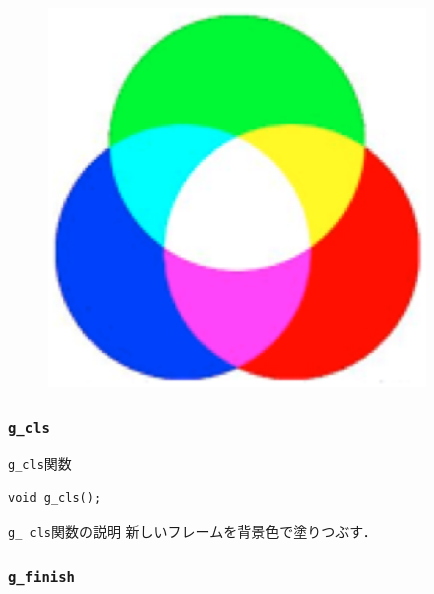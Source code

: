 \documentclass[platex,a4paper,12pt]{jsarticle}%
\begin{document}
\begin{figure}[htb]
\includegraphics[width=100mm]{./Figures/eps/Canvas_g_scr_color.eps}
\end{figure}



\subsubsection{\texttt{g\_cls}}

\begin{itembox}[l]{\texttt{g\_cls}関数}
\begin{verbatim}
void g_cls();
\end{verbatim}
\end{itembox}

\begin{itembox}[l]{\texttt{g\_ cls}関数の説明}
	新しいフレームを背景色で塗りつぶす．
\end{itembox}


\clearpage
\subsubsection{\texttt{g\_finish}}
\end{document}
